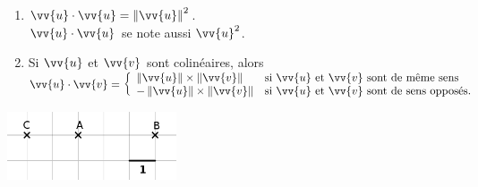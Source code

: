 \documentclass[a4paper,11pt,cours]{nsi} %
\begin{document}
\begin{remarque}
    \begin{enumerate}[label=\textbullet]
        \item $\vv{u} \cdot \vv{u} = \left\|\vv{u}\right\|^2$.\\
        $\vv{u} \cdot \vv{u}$ se note aussi $\vv{u}^2$.
        \item Si $\vv{u}$ et $\vv{v}$ sont colinéaires, alors \\[.5em]
            $\vv{u} \cdot \vv{v}=\left\{\begin{array}{ll}
			\left\| \vv{u}\right\|\times \left\|\vv{v}\right\| & \text{si } \vv{u} \text{ et } \vv{v} \text{ sont de même sens} \\
			-\left\| \vv{u}\right\|\times \left\|\vv{v}\right\| & \text{si } \vv{u} \text{ et } \vv{v} \text{ sont de sens opposés.} \\
		\end{array}
		\right.$ 
    \end{enumerate}
\end{remarque}

\begin{exemple}[ 5]
    {\includegraphics[width=5cm]{exemple5.png}}
\end{exemple}
\end{document}
